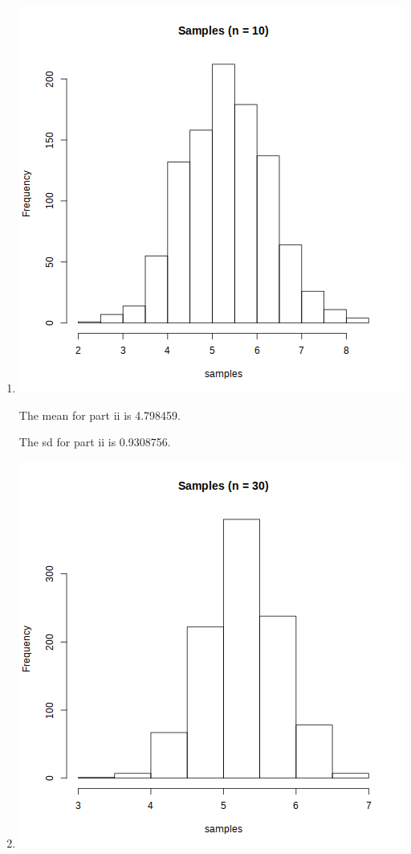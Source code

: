 \documentclass[12pt,letterpaper]{article}
\begin{document}
\begin{enumerate}
\begin{enumerate}
\begin{enumerate}
            \item
              \includegraphics[width=\linewidth]{prob3a_ii.png}

              The mean for part ii is \num{4.798459}.

              The sd for part ii is \num{0.9308756}.
            \item
              \includegraphics[width=\linewidth]{prob3a_iii.png}


\end{enumerate}
\end{enumerate}
\end{enumerate}
\end{document}
